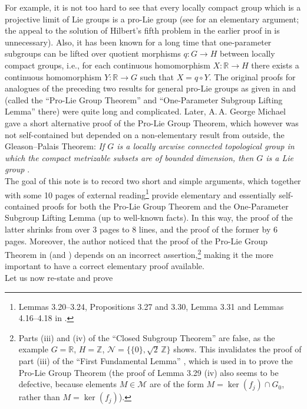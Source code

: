 \documentclass[12pt]{article}
\newcommand{\R}{{\mathbb R}}
\newcommand{\cM}{{\mathcal M}}
\begin{document}
For example, it is not too hard to see
that
every locally compact group which is a projective
limit of Lie groups is a pro-Lie group
(see
\cite{App} for an elementary argument; the appeal to
the solution of Hilbert's fifth problem
in the earlier proof in \cite{HMS} is unnecessary).
Also, it has been known for a long time \cite{HWY}
that one-parameter subgroups
can be lifted over quotient morphisms $q\colon G\to H$
between
locally compact groups, i.e.,
for each continuous homomorphism $X\colon \R\to H$
there exists a continuous homomorphism
$Y\colon \R\to G$ such that $X=q\circ Y$.
The original proofs for analogues of
the preceding two
results for general pro-Lie groups
as given in \cite{HMo} and \cite{HaM}
(called the ``Pro-Lie Group Theorem'' and ``One-Parameter
Subgroup Lifting Lemma'' there)
were quite long and complicated.
Later, A.\,A. George Michael
gave a short alternative proof of the
Pro-Lie Group Theorem,
which however was not self-contained
but depended on a non-elementary result
from outside, the
Gleason--Palais Theorem:
\emph{If $G$ is a locally arcwise connected topological
group in which the compact metrizable
subsets are of bounded dimension,
then $G$ is a Lie group} \cite[Theorem~7.2]{GaP}.\\[2.5mm]
%
The goal of this note is to record
two short and simple arguments, which together
with some
10 pages of external reading\footnote{Lemmas 3.20--3.24, Propositions 3.27
and 3.30,
Lemma 3.31 and Lemmas 4.16--4.18 in \cite{HaM}.}
provide elementary and essentially self-contained
proofs for both the Pro-Lie Group
Theorem and the One-Parameter Subgroup
Lifting Lemma
(up to well-known facts).
In this way,
the proof of the latter shrinks from
over 3 pages to 8 lines,
and the proof of the former by 6 pages.
Moreover, the author noticed that the proof of the
Pro-Lie Group Theorem in \cite{HaM} (and \cite{HMo})
depends on an incorrect assertion,\footnote{Parts (iii) and (iv) of the
``Closed Subgroup Theorem''
\cite[Theorem 1.34]{HaM} are false, as the example $G={\mathbb R}$,
$H={\mathbb Z}$, ${\mathcal N}=
\{\{0\},\sqrt{2} \, {\mathbb Z}\}$ shows.
This invalidates the proof of part (iii) of the ``First Fundamental
Lemma'' \cite[Lemma 3.29]{HaM}, which is used
in \cite{HaM} to prove the Pro-Lie Group Theorem
(the proof of Lemma 3.29 (iv) also seems to be defective,
because elements $M\in \cM$
are of the form $M=\ker(f_j)\cap G_0$,
rather than $M=\ker(f_j)$).}
making it the more important to
have a correct elementary proof
available.\\[2.5mm]
%
Let us now re-state and prove
\end{document}
